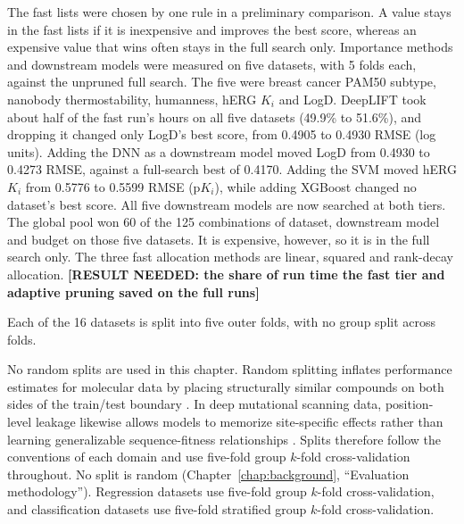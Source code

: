 The fast lists were chosen by one rule in a preliminary comparison. A value stays in the fast lists if it is inexpensive and improves the best score, whereas an expensive value that wins often stays in the full search only. Importance methods and downstream models were measured on five datasets, with 5 folds each, against the unpruned full search. The five were breast cancer PAM50 subtype, nanobody thermostability, humanness, hERG $K_i$ and LogD. DeepLIFT took about half of the fast run's hours on all five datasets (49.9\% to 51.6\%), and dropping it changed only LogD's best score, from 0.4905 to 0.4930 RMSE (log units). Adding the DNN as a downstream model moved LogD from 0.4930 to 0.4273 RMSE, against a full-search best of 0.4170. Adding the SVM moved hERG $K_i$ from 0.5776 to 0.5599 RMSE (p$K_i$), while adding XGBoost changed no dataset's best score. All five downstream models are now searched at both tiers. The global pool won 60 of the 125 combinations of dataset, downstream model and budget on those five datasets. It is expensive, however, so it is in the full search only. The three fast allocation methods are linear, squared and rank-decay allocation. \textbf{[RESULT NEEDED: the share of run time the fast tier and adaptive pruning saved on the full runs]}

Each of the 16 datasets is split into five outer folds, with no group split across folds.

No random splits are used in this chapter. Random splitting inflates performance estimates for molecular data by placing structurally similar compounds on both sides of the train/test boundary \citep{Yang2019, Wallach2018}. In deep mutational scanning data, position-level leakage likewise allows models to memorize site-specific effects rather than learning generalizable sequence-fitness relationships \citep{Notin2023, Vieira2026}. Splits therefore follow the conventions of each domain and use five-fold group $k$-fold cross-validation throughout.
No split is random (Chapter~\ref{chap:background}, ``Evaluation methodology''). Regression datasets use five-fold group $k$-fold cross-validation, and classification datasets use five-fold stratified group $k$-fold cross-validation.

